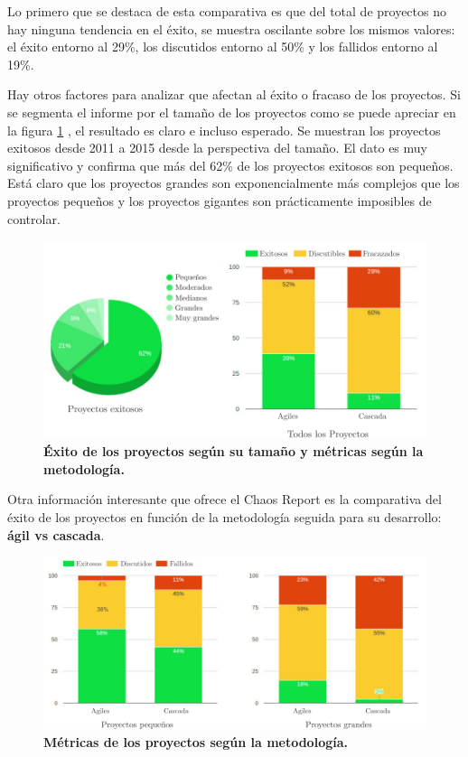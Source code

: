 Lo primero que se destaca de esta comparativa es que del total de proyectos no hay ninguna tendencia en el éxito, se muestra oscilante sobre los mismos valores: el éxito entorno al 29\%, los discutidos entorno al 50\% y los fallidos entorno al 19\%. 

Hay otros factores para analizar que afectan al éxito o fracaso de los proyectos. Si se segmenta el informe por el tamaño de los proyectos como se puede apreciar en la figura \ref{fig:caos1} , el resultado es claro e incluso esperado.
Se muestran los proyectos exitosos desde 2011 a 2015 desde la perspectiva del tamaño. El dato es muy significativo y confirma que más del 62\% de los proyectos exitosos son pequeños. Está claro que los proyectos grandes son exponencialmente más complejos que los proyectos pequeños y los proyectos gigantes son prácticamente imposibles de controlar.

\begin{figure}[h]
\includegraphics[width=15cm]{Img/Desarrollo/caos1.png}
\centering
\caption{\textbf{ \footnotesize{Éxito de los proyectos según su tamaño y métricas según la metodología.}}}
\label{fig:caos1}
\end{figure}

Otra información interesante que ofrece el Chaos Report es la comparativa del éxito de los proyectos en función de la metodología seguida para su desarrollo: \textbf{ágil vs cascada}.

\begin{figure}[h]
\includegraphics[width=15cm]{Img/Desarrollo/caos2.png}
\centering
\caption{\textbf{ \footnotesize{Métricas de los proyectos según la metodología.}}}
\label{fig:caos2}
\end{figure}

